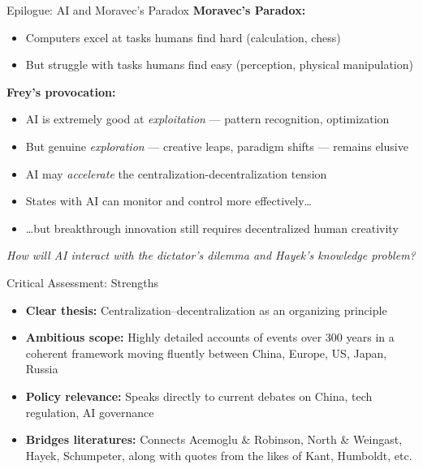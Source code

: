 \documentclass[aspectratio=169, 11pt]{beamer}
\begin{document}

\begin{frame}{Epilogue: AI and Moravec's Paradox}
    \textbf{Moravec's Paradox:}
    \begin{itemize}
        \item Computers excel at tasks humans find hard (calculation, chess)
        \item But struggle with tasks humans find easy (perception, physical manipulation)
    \end{itemize}

    \vspace{0.5em}
    \pause

    \textbf{Frey's provocation:}
    \begin{itemize}
        \item AI is extremely good at \textit{exploitation} --- pattern recognition, optimization
        \item But genuine \textit{exploration} --- creative leaps, paradigm shifts --- remains elusive
        \item AI may \textit{accelerate} the centralization-decentralization tension
        \item States with AI can monitor and control more effectively\ldots
        \item \ldots but breakthrough innovation still requires decentralized human creativity
    \end{itemize}

    \pause
    \vspace{0.5em}
    \begin{center}
        \textit{How will AI interact with the dictator's dilemma and Hayek's knowledge problem?}
    \end{center}
\end{frame}


\begin{frame}{Critical Assessment: Strengths}
    \begin{itemize}
        \item \textbf{Clear thesis:} Centralization--decentralization as an organizing principle
        \item \textbf{Ambitious scope:} Highly detailed accounts of events over 300 years in a coherent framework moving fluently between China, Europe, US, Japan, Russia 
        \item \textbf{Policy relevance:} Speaks directly to current debates on China, tech regulation, AI governance
        \item \textbf{Bridges literatures:} Connects Acemoglu \& Robinson, North \& Weingast, Hayek, Schumpeter, along with quotes from the likes of Kant, Humboldt, etc.
    \end{itemize}
\end{frame}
\end{document}
